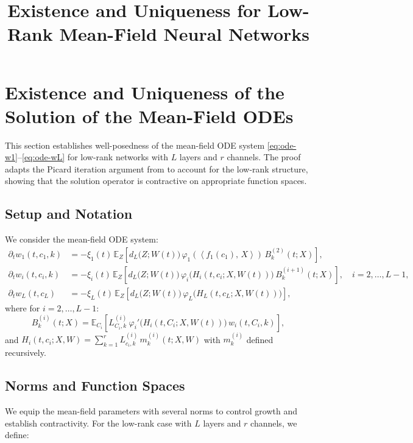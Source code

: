 \documentclass[11pt]{article}
\title{Existence and Uniqueness for Low-Rank Mean-Field Neural Networks}
\author{}
\date{}
\newcommand{\E}{\mathbb{E}}
\newcommand{\1}{\mathbbm{1}}
\newcommand{\ip}[2]{\left\langle #1,\,#2 \right\rangle}
\begin{document}
\maketitle

\section{Existence and Uniqueness of the Solution of the Mean-Field ODEs}
\label{sec:existence-unicity}

This section establishes well-posedness of the mean-field ODE system \eqref{eq:ode-w1}--\eqref{eq:ode-wL} for low-rank networks with $L$ layers and $r$ channels. The proof adapts the Picard iteration argument from \cite{nguyen2023rigorousframeworkmeanfield} to account for the low-rank structure, showing that the solution operator is contractive on appropriate function spaces.

\subsection{Setup and Notation}

We consider the mean-field ODE system:
\begin{align}
\partial_t w_1(t,c_1,k) &= -\xi_1(t)\,\E_{Z}\!\left[d_L\big(Z;W(t)\big)\,\varphi_1\!\left(\ip{f_1(c_1)}{X}\right)\,B_k^{(2)}(t;X)\right], \label{eq:ode-w1-existence}\\
\partial_t w_i(t,c_i,k) &= -\xi_i(t)\,\E_{Z}\!\left[d_L\big(Z;W(t)\big)\,\varphi_i\!\Big(H_i(t,c_i;X,W(t))\Big)\,B_k^{(i+1)}(t;X)\right], \quad i=2,\ldots,L-1, \label{eq:ode-wi-existence}\\
\partial_t w_L(t,c_L) &= -\xi_L(t)\,\E_{Z}\!\left[d_L\big(Z;W(t)\big)\,\varphi_L\!\Big(H_L(t,c_L;X,W(t))\Big)\right], \label{eq:ode-wL-existence}
\end{align}
where for $i=2,\ldots,L-1$:
\[
B_k^{(i)}(t;X)=\E_{C_i}\!\left[L^{(i)}_{C_i,k}\,\varphi_i'\!\Big(H_i(t,C_i;X,W(t))\Big)\,w_i(t,C_i,k)\right],
\]
and $H_i(t,c_i;X,W) = \sum_{k=1}^r L^{(i)}_{c_i,k}\,m_k^{(i)}(t;X,W)$ with $m_k^{(i)}$ defined recursively.

\subsection{Norms and Function Spaces}

We equip the mean-field parameters with several norms to control growth and establish contractivity. For the low-rank case with $L$ layers and $r$ channels, we define:
\end{document}
